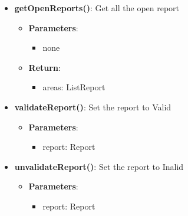 \documentclass{article}
\begin{document}
\begin{itemize}
\begin{itemize}
				Get the list of report
				\begin{itemize}
					\item \textbf{Parameters}:
						\begin{itemize}
							\item filter: List\textlangle{}ReportType\textrangle{}
							\item from: Date \textit{analyze data only starting from this date}
							\item to: Date \textit{analyze data only until this date}
						\end{itemize}
					\item \textbf{Return}:
						\begin{itemize}
							\item areas: List\textlangle{}Report\textrangle{}
						\end{itemize}
				\end{itemize}
			\item \textbf{getOpenReports()}:
				Get all the open report
				\begin{itemize}
					\item \textbf{Parameters}:
						\begin{itemize}
							\item none
						\end{itemize}
					\item \textbf{Return}:
						\begin{itemize}
							\item areas: List\textlangle{}Report\textrangle{}
						\end{itemize}
				\end{itemize}
			\item \textbf{validateReport()}:
				Set the report to Valid
				\begin{itemize}
					\item \textbf{Parameters}:
						\begin{itemize}
							\item report: Report
						\end{itemize}
				\end{itemize}
			\item \textbf{unvalidateReport()}:
				Set the report to Inalid
				\begin{itemize}
					\item \textbf{Parameters}:
						\begin{itemize}
							\item report: Report
						\end{itemize}

\end{itemize}
\end{itemize}
\end{itemize}
\end{document}
